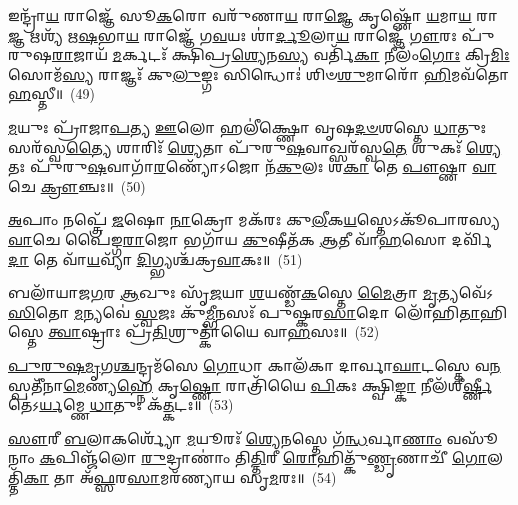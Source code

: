 {\anuvakamend[{\-\ul{𑌪𑍍𑌰}\-𑌤𑍀\-\ul{𑌚𑍀} 𑌦𑌿𑌕𑍍𑌤𑌸𑍍𑌯𑌾॑𑌸𑍍𑌤𑍇 \ul{𑌦𑍍𑌵𑌿}\-𑌷𑍍𑌮𑍋 𑌯𑌶𑍍𑌚᳴ 𑌨𑌿\-\ul{𑌲𑌿}\-𑌮𑍍𑌪𑌾 𑌨𑌾\-\ul{𑌮𑍇}\-𑌹 \ul{𑌗𑍃}\-𑌹𑌾 𑌇𑌤𑌿᳴ \ul{𑌲𑍂}\-𑌕𑍍𑌷𑍋 𑌵𑌸𑍀᳴𑌯𑌾𑌨𑍍𑌭𑌵𑌤𑌿}]}%

𑌇𑌨𑍍𑌦𑍍𑌰𑌾᳴\-\ul{𑌯} 𑌰𑌾𑌜𑍍𑌞𑍇᳴ 𑌸𑍂\-\ul{𑌕}\-𑌰𑍋 𑌵𑌰𑍁᳴𑌣𑌾\-\ul{𑌯} 𑌰𑌾\-\ul{𑌜𑍍𑌞𑍇} 𑌕𑍃𑌷𑍍𑌣𑍋᳴ \ul{𑌯}\-𑌮𑌾\-\ul{𑌯} 𑌰𑌾\-\ul{𑌜𑍍𑌞} 𑌋𑌶𑍍𑌯᳴ 𑌋\-\ul{𑌷}\-𑌭𑌾\-\ul{𑌯} 𑌰𑌾𑌜𑍍𑌞𑍇᳴ 𑌗\-\ul{𑌵}\-𑌯𑌃 𑌶𑌾॑\-\ul{𑌰𑍍𑌦𑍂}\-𑌲𑌾\-\ul{𑌯} 𑌰𑌾𑌜𑍍𑌞𑍇᳴ \ul{𑌗𑍗}\-𑌰𑌃 𑌪𑍁᳴𑌰𑍁𑌷\-\ul{𑌰𑌾}\-𑌜𑌾𑌯᳴ \ul{𑌮}\-𑌰𑍍𑌕𑌟𑌃᳴ 𑌕𑍍𑌷𑌿𑌪𑍍𑌰\-\ul{𑌶𑍍𑌯𑍇}\-𑌨\-\ul{𑌸𑍍𑌯} 𑌵𑌰𑍍𑌤𑌿᳴\-\ul{𑌕𑌾} 𑌨𑍀𑌲𑌂᳴\-\ul{𑌗𑍋𑌃} 𑌕𑍍𑌰𑌿\-\ul{𑌮𑌿𑌃} 𑌸𑍋𑌮᳴\-\ul{𑌸𑍍𑌯} 𑌰𑌾𑌜𑍍𑌞𑌃᳴ 𑌕𑍁\-\ul{𑌲𑍁}\-𑌙𑍍𑌗𑌃 𑌸𑌿𑌨𑍍𑌧𑍋𑌃॑ 𑌶𑌿𑍞\-\ul{𑌶𑍁}\-𑌮𑌾𑌰𑍋᳴ \ul{𑌹𑌿}\-𑌮𑌵᳴𑌤𑍋 \ul{𑌹}\-𑌸𑍍𑌤𑍀॥~(49)

{\anuvakamend[{𑌇𑌨𑍍𑌦𑍍𑌰𑌾᳴\-\ul{𑌯𑌾}\-𑌷𑍍𑌟𑌾𑌵𑌿𑍞᳴𑌶𑌤𑌿𑌃}]}%

\-\ul{𑌮}\-𑌯𑍁𑌃 𑌪𑍍𑌰𑌾᳴𑌜𑌾\-\ul{𑌪}\-𑌤𑍍𑌯 \ul{𑌊}\-𑌲𑍋 𑌹𑌲𑍀॑𑌕𑍍𑌷𑍍𑌣𑍋 𑌵𑍃𑌷\-\ul{𑌦}\-\-\ul{𑍞}\-𑌶𑌸𑍍𑌤𑍇 \ul{𑌧𑌾}\-𑌤𑍁𑌃 𑌸𑌰᳴𑌸𑍍𑌵\-\ul{𑌤𑍍𑌯𑍈} 𑌶𑌾𑌰𑌿𑌃᳴ \ul{𑌶𑍍𑌯𑍇}\-𑌤𑌾 𑌪𑍁᳴𑌰𑍁\-\ul{𑌷}\-𑌵𑌾𑌖𑍍𑌸𑌰᳴𑌸𑍍𑌵\-\ul{𑌤𑍇} 𑌶𑍁𑌕𑌃᳴ \ul{𑌶𑍍𑌯𑍇}\-𑌤𑌃 𑌪𑍁᳴𑌰𑍁\-\ul{𑌷}\-𑌵𑌾𑌗𑌾᳴\-\ul{𑌰}\-𑌣𑍍𑌯𑍋᳴\-𑌽𑌜𑍋 𑌨᳴\-\ul{𑌕𑍁}\-𑌲𑌃 𑌶\-\ul{𑌕𑌾} 𑌤𑍇 \ul{𑌪𑍗}\-𑌷𑍍𑌣𑌾 \ul{𑌵𑌾}\-𑌚𑍇 \ul{𑌕𑍍𑌰𑍗}\-𑌞𑍍𑌚𑌃॥~(50)

{\anuvakamend[{\-\ul{𑌮}\-𑌯𑍁𑌸𑍍𑌤𑍍𑌰𑌯𑍋᳴𑌵𑌿𑍞𑌶𑌤𑌿𑌃}]}%

\-\ul{𑌅}\-𑌪𑌾𑌂 𑌨𑌪𑍍𑌤𑍍𑌰𑍇᳴ \ul{𑌜}\-𑌷𑍋 \ul{𑌨𑌾}\-𑌕𑍍𑌰𑍋 𑌮𑌕᳴𑌰𑌃 𑌕𑍁\-\ul{𑌲𑍀}\-𑌕\-\ul{𑌯}\-𑌸𑍍𑌤𑍇\-𑌽𑌕𑍂᳴𑌪𑌾𑌰𑌸𑍍𑌯 \ul{𑌵𑌾}\-𑌚𑍇 𑌪𑍈॑𑌙𑍍𑌗\-\ul{𑌰𑌾}\-𑌜𑍋 𑌭𑌗𑌾᳴𑌯 \ul{𑌕𑍁}\-𑌷𑍀𑌤᳴𑌕 \ul{𑌆}\-𑌤𑍀 𑌵𑌾᳴\-\ul{𑌹}\-𑌸𑍋 𑌦𑌰𑍍𑌵𑌿᳴\-\ul{𑌦𑌾} 𑌤𑍇 𑌵𑌾᳴\-\ul{𑌯}\-𑌵𑍍𑌯𑌾᳴ \ul{𑌦𑌿}\-𑌗𑍍𑌭𑍍𑌯𑌶𑍍𑌚᳴𑌕𑍍𑌰\-\ul{𑌵𑌾}\-𑌕𑌃॥~(51)

{\anuvakamend[{\-\ul{𑌅}\-𑌪𑌾𑌮𑍇\-\ul{𑌕𑌾}\-𑌨𑍍𑌨𑌵𑌿𑍞᳴𑌶𑌤𑌿𑌃}]}%

𑌬𑌲𑌾᳴𑌯𑌾𑌜\-\ul{𑌗}\-𑌰 \ul{𑌆}\-𑌖𑍁𑌃 𑌸𑍃᳴\-\ul{𑌜}\-𑌯𑌾 \ul{𑌶}\-𑌯𑌣𑍍𑌡᳴\-\ul{𑌕}\-𑌸𑍍𑌤𑍇 \ul{𑌮𑍈}\-𑌤𑍍𑌰𑌾 \ul{𑌮𑍃}\-𑌤𑍍𑌯𑌵𑍇᳴\-𑌽\-\ul{𑌸𑌿}\-𑌤𑍋 \ul{𑌮}\-𑌨𑍍𑌯𑌵𑍇॑ \ul{𑌸𑍍𑌵}\-𑌜𑌃 𑌕𑍁᳴\-\ul{𑌮𑍍𑌭𑍀}\-𑌨𑌸𑌃᳴ 𑌪𑍁𑌷𑍍𑌕𑌰\-\ul{𑌸𑌾}\-𑌦𑍋 𑌲𑍋᳴𑌹𑌿\-\ul{𑌤𑌾}\-𑌹𑌿𑌸𑍍𑌤𑍇 \ul{𑌤𑍍𑌵𑌾}\-𑌷𑍍𑌟𑍍𑌰𑌾𑌃 𑌪𑍍𑌰᳴\-\ul{𑌤𑌿}\-𑌶𑍍𑌰𑍁𑌤𑍍𑌕𑌾᳴𑌯𑍈 𑌵𑌾\-\ul{𑌹}\-𑌸𑌃॥~(52)

{\anuvakamend[{}]}

\-\ul{𑌪𑍁}\-\-\ul{𑌰𑍁}\-\-\ul{𑌷}\-\-\ul{𑌮𑍃}\-𑌗\-\ul{𑌶𑍍𑌚}\-𑌨𑍍𑌦𑍍𑌰𑌮᳴𑌸𑍇 \ul{𑌗𑍋}\-𑌧𑌾 𑌕𑌾𑌲᳴𑌕𑌾 𑌦𑌾𑌰𑍍𑌵𑌾\-\ul{𑌘𑌾}\-𑌟𑌸𑍍𑌤𑍇 𑌵\-\ul{𑌨}\-𑌸𑍍𑌪𑌤𑍀᳴𑌨𑌾\-\ul{𑌮𑍇}\-𑌣𑍍𑌯\-\ul{𑌹𑍍𑌨𑍇} 𑌕𑍃\-\ul{𑌷𑍍𑌣𑍋} 𑌰𑌾𑌤𑍍𑌰𑌿᳴𑌯𑍈 \ul{𑌪𑌿}\-𑌕𑌃 𑌕𑍍𑌷𑍍𑌵𑌿\-\ul{𑌙𑍍𑌕𑌾} 𑌨𑍀𑌲᳴𑌶𑍀\-\ul{𑌰𑍍𑌷𑍍𑌣𑍀} 𑌤𑍇॑\-𑌽\-\ul{𑌰𑍍𑌯}\-𑌮𑍍𑌣𑍇 \ul{𑌧𑌾}\-𑌤𑍁𑌃 𑌕᳴\-\ul{𑌤𑍍𑌕}\-𑌟𑌃॥~(53)

{\anuvakamend[{}]}

\-\ul{𑌸𑍗}\-𑌰𑍀 \ul{𑌬}\-𑌲𑌾𑌕𑌰𑍍𑌶𑍍𑌯𑍋᳴ \ul{𑌮}\-𑌯𑍂𑌰𑌃᳴ \ul{𑌶𑍍𑌯𑍇}\-𑌨𑌸𑍍𑌤𑍇 𑌗᳴\-\ul{𑌨𑍍𑌧}\-𑌰𑍍𑌵𑌾\-\ul{𑌣𑌾𑌂} 𑌵𑌸𑍂᳴𑌨𑌾𑌂 \ul{𑌕}\-𑌪𑌿𑌞𑍍𑌜᳴𑌲𑍋 \ul{𑌰𑍁}\-𑌦𑍍𑌰𑌾𑌣𑌾𑌂॑ 𑌤𑌿\-\ul{𑌤𑍍𑌤𑌿}\-𑌰𑍀 \ul{𑌰𑍋}\-𑌹𑌿𑌤𑍍𑌕𑍁᳴\-\ul{𑌣𑍍𑌡𑍃}\-𑌣𑌾𑌚𑍀᳴ \ul{𑌗𑍋}\-𑌲𑌤𑍍𑌤𑌿᳴\-\ul{𑌕𑌾} 𑌤𑌾 𑌅᳴\-\ul{𑌫𑍍𑌸}\-𑌰\-\ul{𑌸𑌾}\-𑌮𑌰᳴𑌣𑍍𑌯𑌾𑌯 𑌸𑍃\-\ul{𑌮}\-𑌰𑌃॥~(54)

